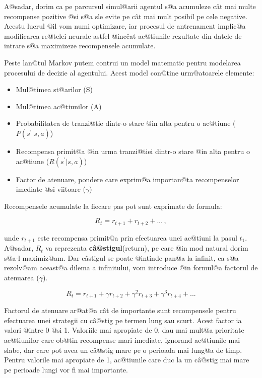 A@sadar, dorim ca pe parcursul simul@arii agentul s@a acumuleze c\^ at mai multe recompense pozitive @si s@a sle evite pe c\^ at mai mult posibil pe cele negative. Acestu lucrul @il vom numi optimizare, iar procesul de antrenament implic@a modificarea re@telei neurale astfel @inc\^ cat ac@tiunile rezultate din datele de intrare s@a maximizeze recompensele acumulate.

Peste lan@tul Markov putem contrui un model matematic pentru modelarea procesului de decizie al agentului. Acest model con@tine urm@atoarele elemente:

\begin{itemize}
	\item Mul@timea st@arilor (S)
	\item Mul@timea ac@tiunilor (A)
	\item Probabilitatea de tranzi@tie dintr-o stare @in alta pentru o ac@tiune ($P(s^{\prime}|s, a)$)
	\item Recompensa primit@a @in urma tranzi@tiei dintr-o stare @in alta pentru o ac@tiune ($R(s^{\prime}|s, a)$)
	\item Factor de atenuare, pondere care exprim@a importan@ta recompenselor imediate @si viitoare ($\gamma$)
\end{itemize}

Recompensele acumulate la fiecare pas pot sunt exprimate de formula: 

$$ R_t = r_{t+1} + r_{t+2} + ... \,,$$ 

\noindent unde $r_{t+1}$ este recompensa primit@a prin efectuarea unei ac@tiuni la pasul $t_1$. A@sadar, $R_t$ va reprezenta \textbf{c\^ a@stigul}(return), pe care @in mod natural dorim s@a-l maximiz@am. Dar c\^ astigul se poate @intinde pan@a la infinit, ca s@a rezolv@am aceast@a dilema a infinitului, vom introduce @in formul@a factorul de atenuarea ($\gamma$).

$$ R_t = r_{t+1} + \gamma r_{t+2} + \gamma^{2} r_{t+3} + \gamma^{3} r_{t+4} + ... $$

Factorul de atenuare ar@at@a c\^ at de importante sunt recompensele pentru efectuarea unei strategii cu c\^ a@stig pe termen lung sau scurt. Acest factor ia valori @intre 0 @si 1. Valoriile mai apropiate de 0, dau mai mult@a prioritate ac@tiunilor care ob@tin recompense mari imediate, ignorand ac@tiunile mai slabe, dar care pot avea un c\^ a@stig mare pe o perioada mai lung@a de timp. Pentru valorile mai apropiate de 1, ac@tiunile care duc la un c\^ a@stig mai mare pe perioade lungi vor fi mai importante.

